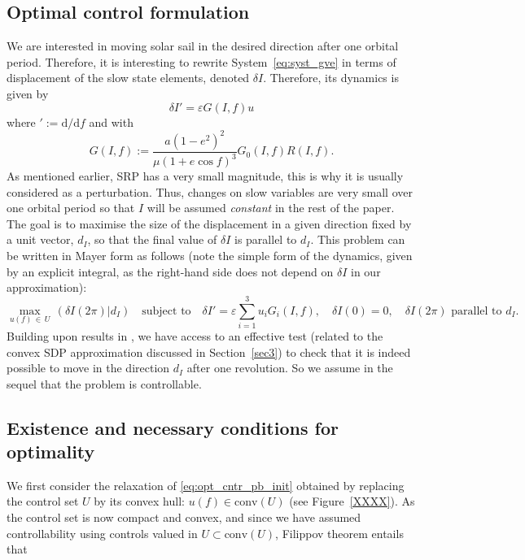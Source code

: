\documentclass[AMA,STIX1COL]{WileyNJD-v2}
\newcommand{\conv}{\text{conv}}
\renewcommand{\epsilon}{\varepsilon}
\newcommand{\veps}{\varepsilon}
\newcommand{\mybar}[1]{#1}
\begin{document}
\subsection{Optimal control formulation}
We are interested in moving solar sail in the desired direction after one orbital period. Therefore, it is interesting
to rewrite System~\eqref{eq:syst_gve} in terms of displacement of the slow state elements,
denoted $\delta I$. Therefore, its dynamics is given by 
%
\begin{equation}
	\label{eq:deltaI_notslow}
	\delta I'= \veps G(I,f) u
\end{equation}
where $' := \textrm{d}/{\textrm{d}f}$ and with
$$ G(I,f) := \dfrac{a \left( 1 - e^2 \right)^2}{\mu(1+e\cos f)^3} G_0(I,f)R(I,f). $$
%
As mentioned earlier, \ac{SRP}
has a very small magnitude, this is why it is usually considered as a perturbation. Thus, changes on slow
variables are very small over one orbital period so that $I$ will be assumed \emph{constant} in the rest
of the paper.
%
The goal is to maximise the size of the displacement in a given direction fixed by a unit vector,
$d_I$, so that the final
value of $\delta I$ is parallel to $d_I$. This problem can be
written in Mayer form as follows (note the simple form of the dynamics,
given by an explicit integral, as the right-hand side does not depend on $\delta I$ in our
approximation):
%
\begin{equation}
	\label{eq:opt_cntr_pb_init}
		\max_{u(f) \, \in \, U} \,  (\delta I(2\pi)|d_I) \quad \textrm{subject to}  \quad
		\delta I' = \veps \sum_{i=1}^{3} u_i G_i (I,f),\quad
		\delta I (0) = 0, \quad \delta I (2 \pi) \text{ parallel to } d_I.
\end{equation}
Building upon results in \cite{herasimenka:hal-03185532, control2022},
we have access to an effective test (related to the
convex SDP approximation discussed in Section~\ref{sec3}) to check that it is indeed possible to move 
in the direction $d_I$ after one revolution. So we assume in the sequel that the problem is controllable. 

\subsection{Existence and necessary conditions for optimality}
\label{ssec:hamiltonian_descr}
We first consider the relaxation of \eqref{eq:opt_cntr_pb_init} obtained by replacing the control set $U$ by its
convex hull: $u(f) \in \conv(U)$ (see Figure~\ref{XXXX}).
As the control set is now compact and convex, and since we have assumed controllability using controls
valued in $U \subset \conv(U)$, Filippov theorem entails that
\end{document}
